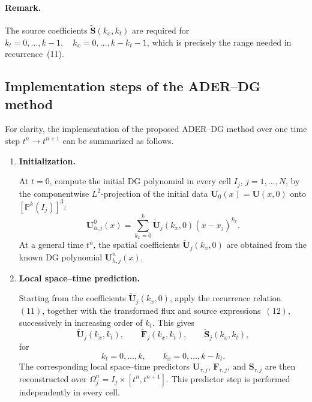 \documentclass[11pt]{article}
\begin{document}
\paragraph{Remark.}
The source coefficients \(\widetilde{\mathbf{S}}(k_x,k_t)\) are required  for
\(k_t=0,\ldots,k - 1,\quad k_x=0,\ldots,k-k_t-1\), which is precisely the range needed in recurrence~(11).


\subsection{Implementation steps of the ADER--DG method}

For clarity, the implementation of the proposed ADER--DG method over one
time step \(t^n\longrightarrow t^{n+1}\) can be summarized as follows.

\begin{enumerate}

    \item \textbf{Initialization.}
    
    At \(t=0\), compute the initial DG polynomial in every cell
    \(I_j\), \(j=1,\ldots,N\), by the componentwise \(L^2\)-projection
    of the initial data \(\mathbf{U}_0(x)=\mathbf{U}(x,0)\) onto
    \([\mathbb{P}^k(I_j)]^3\):
    \[
        \mathbf{U}_{h,j}^{0}(x)
        =
        \sum_{k_x=0}^{k}
        \widetilde{\mathbf{U}}_j(k_x,0)
        (x-x_j)^{k_x}.
    \]
    At a general time \(t^n\), the spatial coefficients
    \(\widetilde{\mathbf{U}}_j(k_x,0)\) are obtained from the known DG
    polynomial \(\mathbf{U}_{h,j}^{n}(x)\).

    \item \textbf{Local space--time prediction.}
    
    Starting from the coefficients
    \(\widetilde{\mathbf{U}}_j(k_x,0)\), apply the recurrence
    relation~\((11)\), together with the transformed flux and source
    expressions~\((12)\), successively in increasing order of \(k_t\).
    This gives
    \[
        \widetilde{\mathbf{U}}_j(k_x,k_t),\qquad
        \widetilde{\mathbf{F}}_j(k_x,k_t),\qquad
        \widetilde{\mathbf{S}}_j(k_x,k_t),
    \]
    for
    \[
        k_t=0,\ldots,k,
        \qquad
        k_x=0,\ldots,k-k_t.
    \]
    The corresponding local space--time predictors
    \(\mathbf{U}_{\tau,j}\), \(\mathbf{F}_{\tau,j}\), and
    \(\mathbf{S}_{\tau,j}\) are then reconstructed over
    \(\Omega_j^n=I_j\times[t^n,t^{n+1}]\). This predictor step is
    performed independently in every cell.


\end{enumerate}
\end{document}
